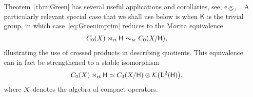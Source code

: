 \documentclass[pdftex]{sigma}
\numberwithin{equation}{section}
\newcommand{\mbf}[1]{{\boldsymbol {#1} }}
\newcommand{\CK}{\mathcal{K}}
\newcommand{\sfH}{\mathsf{H}}
\newcommand{\sfK}{\mathsf{K}}
\newcommand{\Leb}{{\rm L}}
\newcommand{\rt}{{\rm rt}}
\begin{document}
Theorem~\ref{thm:Green} has several useful applications and
corollaries, see, e.g.,~\cite{Rieffel1976}. A particularly relevant
special case that we shall use below is when $\sfK $ is the trivial group,
in which case~\eqref{eq:Greenimprim} reduces to the Morita equivalence
\begin{gather*}%
C_0(X)\rtimes_\rt \sfH \ \mbf\sim_{\text{\tiny M}} \ C_0(X/\sfH ) ,
\end{gather*}
illustrating the use of crossed products in describing
quotients. This equivalence can in fact be strengthened to a stable
isomorphism~\cite{Rieffel1976}
\begin{gather}\label{eq:XsfHiso}
C_0(X)\rtimes_\rt \sfH \simeq C_0(X/\sfH ) \otimes \CK\big(\Leb^2(\sfH)\big) ,
\end{gather}
where $\CK$ denotes the algebra of
compact operators.
\end{document}
